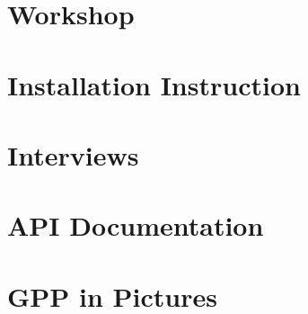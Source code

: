  \appendix

\chapter{Workshop}


\chapter{Installation Instruction}


\chapter{Interviews}


\chapter{API Documentation}


\chapter{GPP in Pictures}

